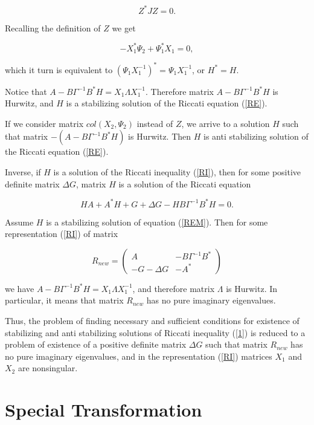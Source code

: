 \documentclass[11pt, reqno]{amsart}
\theoremstyle{plain}
\begin{document}
$$ Z^{*}JZ=0. $$

\noindent Recalling the definition of $Z$ we get 

$$ -X_{1}^{*}\Psi_{2} + \Psi_{1}^{*}X_{1}=0,$$

\noindent which it turn is equivalent to $(\Psi_{1}X_{1}^{-1})^{*}=\Psi_{1}X_{1}^{-1}$, or $H^{*}=H$. 

Notice that $A-B\Gamma^{-1}B^{*}H=X_{1}\Lambda X_{1}^{-1}$. Therefore matrix $A-B\Gamma^{-1}B^{*}H$ is Hurwitz, and $H$ is a stabilizing solution of the Riccati equation (\ref{RE}). 

If we consider matrix $col(X_{2},\Psi_{2})$ instead of $Z$, we arrive to a solution $H$ such that matrix $-(A-B\Gamma^{-1}B^{*}H)$ is Hurwitz. Then $H$ is anti stabilizing solution of the Riccati equation (\ref{RE}).

Inverse, if $H$ is a solution of the Riccati inequality (\ref{RI}), then for some positive definite matrix $\Delta G$, matrix $H$ is a solution of the Riccati equation 

\begin{equation}\label{REM}
HA + A^{*}H + G + \Delta G - HB\Gamma^{-1}B^{*}H = 0.
\end{equation}

Assume $H$ is a stabilizing solution of equation (\ref{REM}). Then for some representation (\ref{RI}) of matrix 

$$ R_{new} = \left(\begin{array}{cc}
A & -B\Gamma^{-1}B^{*} \\  -G-\Delta G & -A^{*} \end{array}\right)
$$

\noindent we have $A-B\Gamma^{-1}B^{*}H=X_{1}\Lambda X_{1}^{-1}$, and therefore matrix $\Lambda$ is Hurwitz. In particular, it means that matrix $R_{new}$ has no pure imaginary eigenvalues.

Thus, the problem of finding necessary and sufficient conditions for existence of stabilizing and anti stabilizing solutions of Riccati inequality (\ref{1}) is reduced to a problem of existence of a positive definite matrix $\Delta G$ such that matrix $R_{new}$ has no pure imaginary eigenvalues, and in the representation (\ref{RI}) matrices $X_{1}$ and $X_{2}$ are nonsingular.


\section{Special Transformation}
\end{document}
